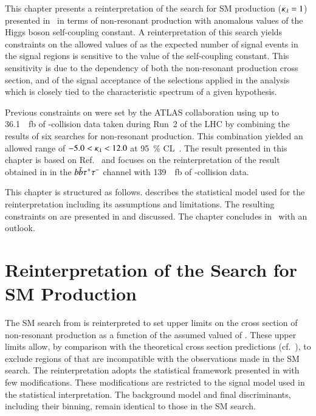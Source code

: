 This chapter presents a reinterpretation of the search for SM \HH
production ($\kappa_{\lambda} = 1$) presented in~ in terms
of non-resonant \HH production with anomalous values of the Higgs
boson self-coupling constant. A reinterpretation of this search yields
constraints on the allowed values of \klambda as the expected number
of signal events in the signal regions is sensitive to the value of
the self-coupling constant. This sensitivity is due to the \klambda
dependency of both the non-resonant \HH production cross section, and
of the signal acceptance of the selections applied in the analysis
which is closely tied to the characteristic \mHH spectrum of a given
\klambda hypothesis.

Previous constraints on \klambda were set by the ATLAS collaboration
using up to \SI{36.1}{\per\femto\barn} of \pp-collision data taken
during Run~2 of the LHC by combining the results of six searches for
non-resonant \HH production. This combination yielded an allowed range
of $-5.0 < \kappa_{\lambda} < 12.0$ at \SI{95}{\percent}
CL~\cite{HDBS-2018-58}. The result presented in this chapter is based
on Ref.~\cite{ATLAS-CONF-2021-052} and focuses on the reinterpretation
of the result obtained in  in the $b\bar{b}\tau^{+} \tau^{-}$
channel with \SI{139}{\per\femto\barn} of \pp-collision data.

This chapter is structured as follows. 
describes the statistical model used for the reinterpretation
including its assumptions and limitations. The resulting constraints
on \klambda are presented in  and
discussed. The chapter concludes
in~ with an outlook.


\section{Reinterpretation of the Search for SM \HH Production}%
\label{sec:reinterpretation}

The SM \HH search from  is reinterpreted to set
upper limits on the cross section of non-resonant \HH production as a
function of the assumed valued of \klambda. These upper limits allow,
by comparison with the theoretical cross section predictions
(cf.~), to exclude regions of \klambda that are
incompatible with the observations made in the SM \HH search. The
reinterpretation adopts the statistical framework presented in
 with few modifications. These
modifications are restricted to the signal model used in the
statistical interpretation. The background model and final
discriminants, including their binning, remain identical to those in
the SM \HH search.

